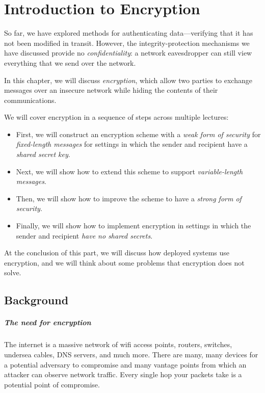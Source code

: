\chapter{Introduction to Encryption}

So far, we have explored methods for authenticating data---verifying that it has not been modified in transit.
However, the integrity-protection mechanisms we
have discussed provide no \emph{confidentiality}:
a network eavesdropper can still view everything that 
we send over the network.

In this chapter, we will discuss \emph{encryption},
which allow two parties to exchange messages over an insecure
network while hiding the contents of their communications.


We will cover encryption in a sequence of steps across multiple lectures:
\begin{itemize}
  \item First, we will construct an encryption scheme with a \emph{weak form of security} for \emph{fixed-length messages} for settings in which the sender and recipient have a \emph{shared secret key}.
  \item Next, we will show how to extend this scheme to support \emph{variable-length messages}.
  \item Then, we will show how to improve the scheme to have a \emph{strong form of security}.
  \item Finally, we will show how to implement encryption in settings in which the sender and recipient \emph{have no shared secrets}.
\end{itemize}
At the conclusion of this part, we will discuss how deployed systems
use encryption, and 
we will think about some problems that encryption does not solve.

\section{Background}

\paragraph{The need for encryption}
The internet is a massive network of wifi access
points, routers, switches, undersea cables, DNS
servers, and much more.
There are many, many
devices for a potential adversary to compromise
and many vantage points from which an attacker can 
observe network traffic. Every single hop your
packets take is a potential point of compromise.

